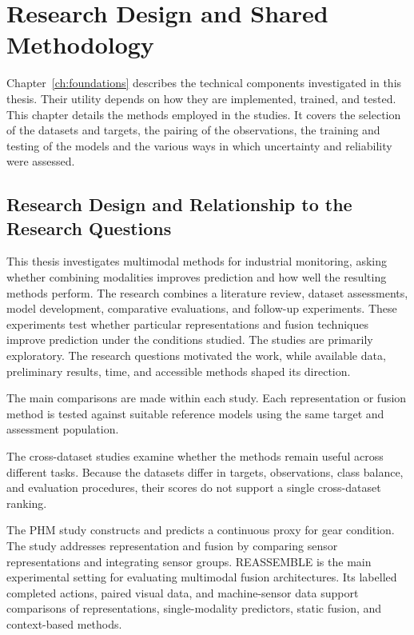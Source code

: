 \chapter{Research Design and Shared Methodology}
\label{ch:methodology}

Chapter~\ref{ch:foundations} describes the technical components investigated in this thesis. Their utility depends on how they are implemented, trained, and tested. This chapter details the methods employed in the studies. It covers the selection of the datasets and targets, the pairing of the observations, the training and testing of the models and the various ways in which uncertainty and reliability were assessed.

\section{Research Design and Relationship to the Research Questions}

This thesis investigates multimodal methods for industrial monitoring, asking whether combining modalities improves prediction and how well the resulting methods perform. The research combines a literature review, dataset assessments, model development, comparative evaluations, and follow-up experiments. These experiments test whether particular representations and fusion techniques improve prediction under the conditions studied. The studies are primarily exploratory. The research questions motivated the work, while available data, preliminary results, time, and accessible methods shaped its direction.

The main comparisons are made within each study. Each representation or fusion method is tested against suitable reference models using the same target and assessment population.

The cross-dataset studies examine whether the methods remain useful across different tasks. Because the datasets differ in targets, observations, class balance, and evaluation procedures, their scores do not support a single cross-dataset ranking.

The PHM study constructs and predicts a continuous proxy for gear condition. The study addresses representation and fusion by comparing sensor representations and integrating sensor groups. REASSEMBLE is the main experimental setting for evaluating multimodal fusion architectures. Its labelled completed actions, paired visual data, and machine-sensor data support comparisons of representations, single-modality predictors, static fusion, and context-based methods.


